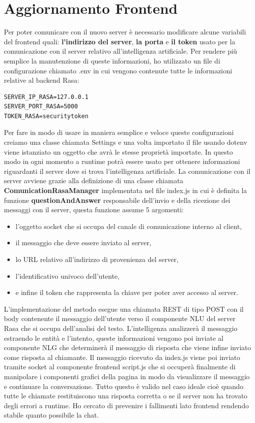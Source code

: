\section{Aggiornamento Frontend}
Per poter comunicare con il nuovo server è necessario modificare alcune variabili del frontend quali: \textbf{l'indirizzo del server}, \textbf{la porta} e \textbf{il token} usato per la comunicazione con il server relativo all'intelligenza artificiale.
Per rendere più semplice la manutenzione di queste informazioni, ho utilizzato un file di configurazione chiamato .env in cui vengono contenute tutte le informazioni relative al backend Rasa:
\begin{lstlisting}
SERVER_IP_RASA=127.0.0.1
SERVER_PORT_RASA=5000
TOKEN_RASA=securitytoken
\end{lstlisting}
Per fare in modo di usare in maniera semplice e veloce queste configurazioni creiamo una classe chiamata Settings e una volta importato il file usando dotenv viene istanziato un oggetto che avrà le stesse proprietà importate. In questo modo in ogni momento a runtime potrà essere usato per ottenere informazioni riguardanti il server dove si trova l'intelligenza artificiale.
La comunicazione con il server avviene grazie alla definizione di una classe chiamata \textbf{ComunicationRasaManager} implementata nel file index.js in cui è definita la funzione \textbf{questionAndAnswer} responsabile dell'invio e della ricezione dei messaggi con il server, questa funzione assume 5 argomenti:
\begin{itemize}
\item l'oggetto socket che si occupa del canale di comunicazione interno al client,
\item il messaggio che deve essere inviato al server,
\item lo URL relativo all'indirizzo di provenienza del server,
\item l'identificativo univoco dell'utente,
\item e infine il token che rappresenta la chiave per poter aver accesso al server.
\end{itemize}
L'implementazione del metodo esegue una chiamata REST di tipo POST con il body contenente il messaggio dell'utente verso il componente NLU del server Rasa che si occupa dell'analisi del testo. L'intelligenza analizzerà il messaggio estraendo le entità e l'intento, queste informazioni vengono poi inviate al componente NLG che determinerà il messaggio di risposta che viene infine inviato come risposta al chiamante. Il messaggio ricevuto da index.js viene poi inviato tramite socket al componente frontend script.js che si occuperà finalmente di manipolare i componenti grafici della pagina in modo da visualizzare il messaggio e continuare la conversazione.
Tutto questo è valido nel caso ideale cioè quando tutte le chiamate restituiscono una risposta corretta o se il server non ha trovato degli errori a runtime. Ho cercato di prevenire i fallimenti lato frontend rendendo stabile quanto possibile la chat. 


